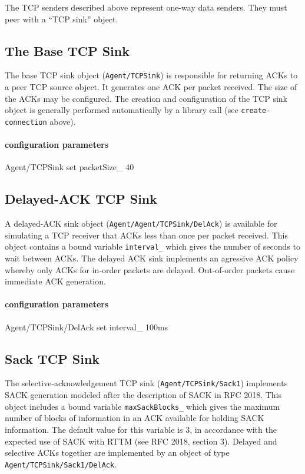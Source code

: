 The TCP senders described above represent one-way data senders.
They must peer with a ``TCP sink'' object.

\subsection{The Base TCP Sink}

The base TCP sink object ({\tt Agent/TCPSink})
is responsible for returning ACKs to
a peer TCP source object.
It generates one ACK per packet received.
The size of the ACKs may be configured.
The creation and configuration of the TCP sink object
is generally performed automatically by a library
call (see {\tt create-connection} above).

\paragraph{configuration parameters}
\begin{program}
	Agent/TCPSink set packetSize_ 40
\end{program}

\subsection{Delayed-ACK TCP Sink}

A delayed-ACK sink object ({\tt Agent/Agent/TCPSink/DelAck}) is available
for simulating a TCP receiver that ACKs less than once per packet received.
This object contains a bound variable {\tt interval\_} which gives the
number of seconds to wait between ACKs.
The delayed ACK sink implements an agressive ACK policy whereby
only ACKs for in-order packets are delayed.
Out-of-order packets cause immediate ACK generation.

\paragraph{configuration parameters}
\begin{program}
	Agent/TCPSink/DelAck set interval_ 100ms
\end{program}

\subsection{Sack TCP Sink}

The selective-acknowledgement TCP sink ({\tt Agent/TCPSink/Sack1}) implements
SACK generation modeled after the description of SACK in RFC 2018.
This object includes a bound variable {\tt maxSackBlocks\_} which gives
the maximum number of blocks of information in an ACK available for
holding SACK information.
The default value for this variable is 3, in accordance with the expected
use of SACK with RTTM (see RFC 2018, section 3).
Delayed and selective ACKs together are implemented by
an object of type {\tt Agent/TCPSink/Sack1/DelAck}.

